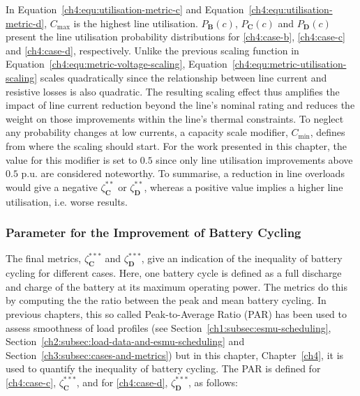 



In Equation~\ref{ch4:equ:utilisation-metric-c} and Equation~\ref{ch4:equ:utilisation-metric-d}, $C_\text{max}$ is the highest line utilisation.
$P_\textbf{B}(c)$, $P_\textbf{C}(c)$ and $P_\textbf{D}(c)$ present the line utilisation probability distributions for \ref{ch4:case-b}, \ref{ch4:case-c} and \ref{ch4:case-d}, respectively.
Unlike the previous scaling function in Equation~\ref{ch4:equ:metric-voltage-scaling}, Equation~\ref{ch4:equ:metric-utilisation-scaling} scales quadratically since the relationship between line current and resistive losses is also quadratic.
The resulting scaling effect thus amplifies the impact of line current reduction beyond the line's nominal rating and reduces the weight on those improvements within the line's thermal constraints.
To neglect any probability changes at low currents, a capacity scale modifier, $C_\text{min}$, defines from where the scaling should start.
For the work presented in this chapter, the value for this modifier is set to $0.5$ since only line utilisation improvements above $0.5$ p.u. are considered noteworthy.
To summarise, a reduction in line overloads would give a negative $\zeta^{**}_\textbf{C}$ or $\zeta^{**}_\textbf{D}$, whereas a positive value implies a higher line utilisation, i.e. worse results.

\subsubsection{Parameter for the Improvement of Battery Cycling}

The final metrics, $\zeta^{***}_\textbf{C}$ and $\zeta^{***}_\textbf{D}$, give an indication of the inequality of battery cycling for different cases.
Here, one battery cycle is defined as a full discharge and charge of the battery at its maximum operating power.
The metrics do this by computing the the ratio between the peak and mean battery cycling.
In previous chapters, this so called Peak-to-Average Ratio (PAR) has been used to assess smoothness of load profiles (see Section~\ref{ch1:subsec:esmu-scheduling}, Section~\ref{ch2:subsec:load-data-and-esmu-scheduling} and Section~\ref{ch3:subsec:cases-and-metrics}) but in this chapter, Chapter~\ref{ch4}, it is used to quantify the inequality of battery cycling.
The PAR is defined for \ref{ch4:case-c}, $\zeta_\textbf{C}^{***}$, and for \ref{ch4:case-d}, $\zeta_\textbf{D}^{***}$, as follows:

